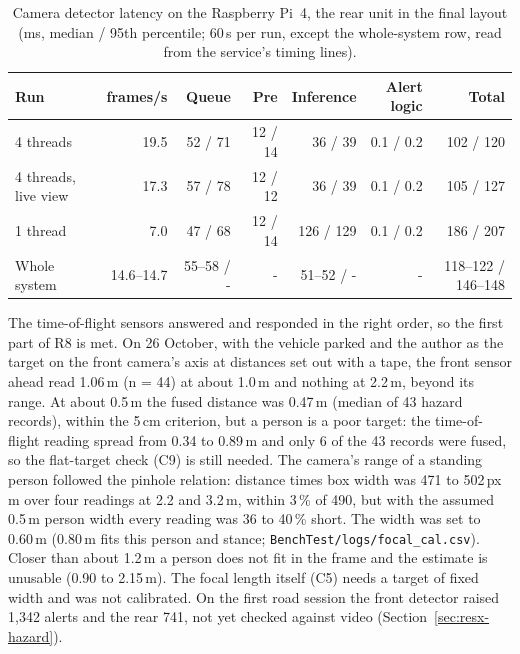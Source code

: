\begin{table}[htbp]
\centering
\caption[Camera detector latency on the Raspberry Pi~4, the rear unit in the final layout (ms, median / 95th percentile; 60\,s per run, except the whole-system row, read from the service's timing lines)]{Camera detector latency on the Raspberry Pi~4, the rear unit in the final layout (ms, median / 95th percentile; 60\,s per run, except the whole-system row, read from the service's timing lines).}
\label{tab:camera-latency}
\small
\begin{tabular}{lrrrrrr}
\hline
Run & frames/s & Queue & Pre & Inference & Alert logic & Total \\
\hline
4 threads & 19.5 & 52 / 71 & 12 / 14 & 36 / 39 & 0.1 / 0.2 & 102 / 120 \\
4 threads, live view & 17.3 & 57 / 78 & 12 / 12 & 36 / 39 & 0.1 / 0.2 & 105 / 127 \\
1 thread & 7.0 & 47 / 68 & 12 / 14 & 126 / 129 & 0.1 / 0.2 & 186 / 207 \\
Whole system & 14.6--14.7 & 55--58 / - & - & 51--52 / - & - & 118--122 / 146--148 \\
\hline
\end{tabular}
\end{table}

The time-of-flight sensors answered and responded in the right order, so the first part of R8 is met. On 26 October, with the vehicle parked and the author as the target on the front camera's axis at distances set out with a tape, the front sensor ahead read 1.06\,m (n = 44) at about 1.0\,m and nothing at 2.2\,m, beyond its range. At about 0.5\,m the fused distance was 0.47\,m (median of 43 hazard records), within the 5\,cm criterion, but a person is a poor target: the time-of-flight reading spread from 0.34 to 0.89\,m and only 6 of the 43 records were fused, so the flat-target check (C9) is still needed. The camera's range of a standing person followed the pinhole relation: distance times box width was 471 to 502\,px\,m over four readings at 2.2 and 3.2\,m, within 3\,\% of 490, but with the assumed 0.5\,m person width every reading was 36 to 40\,\% short. The width was set to 0.60\,m (0.80\,m fits this person and stance; \texttt{BenchTest/\allowbreak{}logs/\allowbreak{}focal\_cal.csv}). Closer than about 1.2\,m a person does not fit in the frame and the estimate is unusable (0.90 to 2.15\,m). The focal length itself (C5) needs a target of fixed width and was not calibrated. On the first road session the front detector raised 1,342 alerts and the rear 741, not yet checked against video (Section~\ref{sec:resx-hazard}).


